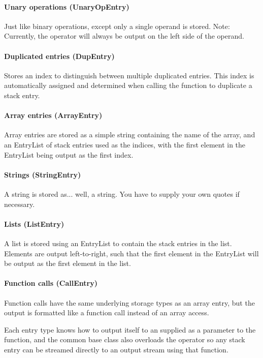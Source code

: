 \paragraph{Unary operations (UnaryOpEntry)}
Just like binary operations, except only a single operand is stored. Note: Currently, the operator will always be output on the left side of the operand.

\paragraph{Duplicated entries (DupEntry)}
Stores an index to distinguish between multiple duplicated entries. This index is automatically assigned and determined when calling the  function to duplicate a stack entry.

\paragraph{Array entries (ArrayEntry)}
Array entries are stored as a simple string containing the name of the array, and an EntryList of stack entries used as the indices, with the first element in the EntryList being output as the first index.

\paragraph{Strings (StringEntry)}
A string is stored as... well, a string. You have to supply your own quotes if necessary.

\paragraph{Lists (ListEntry)}
A list is stored using an EntryList to contain the stack entries in the list. Elements are output left-to-right, such that the first element in the EntryList will be output as the first element in the list.

\paragraph{Function calls (CallEntry)}
Function calls have the same underlying storage types as an array entry, but the output is formatted like a function call instead of an array access.

Each entry type knows how to output itself to an  supplied as a parameter to the  function, and the common base class  also overloads the \code{<<} operator so any stack entry can be streamed directly to an output stream using that function.

